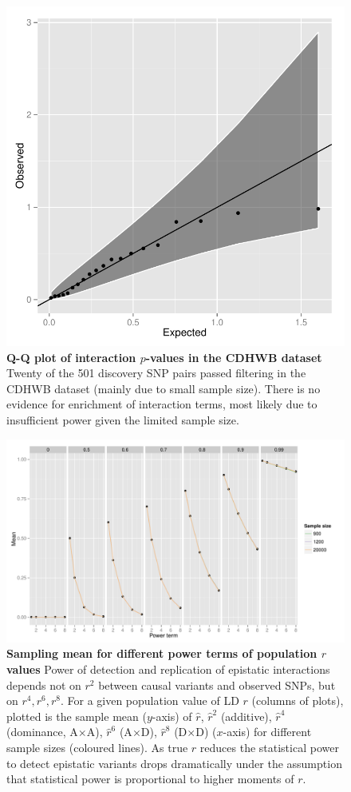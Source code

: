 \documentclass{article}
\begin{document}
\begin{figure}
	\centering
	\includegraphics[width=5in]{qqgg}
	\caption{\textbf{Q-Q plot of interaction $p$-values in the CDHWB dataset} Twenty of the 501 discovery SNP pairs passed filtering in the CDHWB dataset (mainly due to small sample size). There is no evidence for enrichment of interaction terms, most likely due to insufficient power given the limited sample size.}
	\label{fig:qqgg}
\end{figure}
\clearpage

\begin{figure}
	\centering
	\includegraphics[width=5in]{ld_sampling_mean}
	\caption{\textbf{Sampling mean for different power terms of population $r$ values} Power of detection and replication of epistatic interactions depends not on $r^2$ between causal variants and observed SNPs, but on $r^4, r^6, r^8$. For a given population value of LD $r$ (columns of plots), plotted is the sample mean ($y$-axis) of $\hat{r}$, $\hat{r}^2$ (additive), $\hat{r}^4$ (dominance, A$\times$A), $\hat{r}^6$ (A$\times$D), $\hat{r}^8$ (D$\times$D) ($x$-axis) for different sample sizes (coloured lines). As true $r$ reduces the statistical power to detect epistatic variants drops dramatically under the assumption that statistical power is proportional to higher moments of $r$.}
	\label{fig:ld_sampling_mean}
\end{figure}
\clearpage
\end{document}
